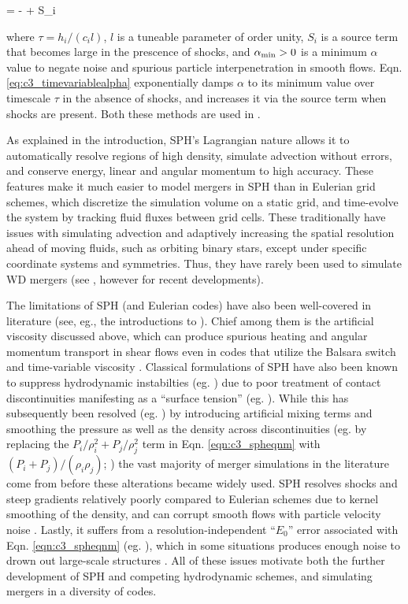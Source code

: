 \eqbegin
{} = - + S_i
\label{eq:c3_timevariablealpha}
\eqend

\noindent where $\tau = h_i/(c_i l)$, $l$ is a tuneable parameter of order unity, $S_i$ is a source term that becomes large in the prescence of shocks, and $\alpha_\mathrm{min} > 0$ is a minimum $\alpha$ value to negate noise and spurious particle interpenetration in smooth flows.  Eqn. \ref{eq:c3_timevariablealpha} exponentially damps $\alpha$ to its minimum value over timescale $\tau$ in the absence of shocks, and increases it via the source term when shocks are present.  Both these methods are used in \gasoline.


As explained in the introduction, SPH's Lagrangian nature allows it to automatically resolve regions of high density, simulate advection without errors, and conserve energy, linear and angular momentum to high accuracy.  These features make it much easier to model mergers in SPH than in Eulerian grid schemes, which discretize the simulation volume on a static grid, and time-evolve the system by tracking fluid fluxes between grid cells.  These traditionally have issues with simulating advection and adaptively increasing the spatial resolution ahead of moving fluids, such as orbiting binary stars, except under specific coordinate systems and symmetries.  Thus, they have rarely been used to simulate WD mergers (see \cite{katz+16}, however for recent developments).

The limitations of SPH (and Eulerian codes) have also been well-covered in literature (see, eg., the introductions to \citealt{spri10, hopk15, katz+16}).  Chief among them is the artificial viscosity discussed above, which can produce spurious heating and angular momentum transport in shear flows even in codes that utilize the Balsara switch and time-variable viscosity \citep{culld10}.  Classical formulations of SPH have also been known to suppress hydrodynamic instabilties (eg. \citealt{ager+07}) due to poor treatment of contact discontinuities manifesting as a ``surface tension'' (eg. \citealt{readha10, hesss10}).  While this has subsequently been resolved (eg. \citealt{hopk13, hu+14, kell+14}) by introducing artificial mixing terms \citep{pric08} and smoothing the pressure as well as the density across discontinuities (eg. by replacing the $P_i/\rho_i^2 + P_j/\rho_j^2$ term in Eqn. \ref{eqn:c3_spheqnm} with $(P_i + P_j)/(\rho_i\rho_j)$; \citealt{kell+14}) the vast majority of merger simulations in the literature come from before these alterations became widely used.  SPH resolves shocks and steep gradients relatively poorly compared to Eulerian schemes due to kernel smoothing of the density, and can corrupt smooth flows with particle velocity noise \citep{spri10rev}.  Lastly, it suffers from a resolution-independent ``$E_0$'' error associated with Eqn. \ref{eqn:c3_spheqnm} (eg. \citealt{readha10}), which in some situations produces enough noise to drown out large-scale structures \citep{hopk15}.  All of these issues motivate both the further development of SPH and competing hydrodynamic schemes, and simulating mergers in a diversity of codes.

